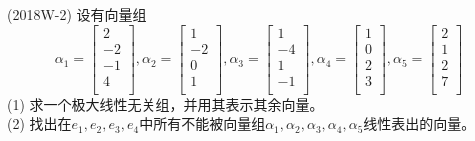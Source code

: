 \documentclass[lang=cn,newtx,10pt,scheme=chinese]{elegantbook}
\begin{document}
\begin{exercise}
    (2018W-2) 设有向量组
    $$
    \alpha_1=
    \left[
    \begin{matrix}
        2 \\
        -2 \\
        -1 \\
        4 \\
    \end{matrix}
    \right],
    \alpha_2=
    \left[
    \begin{matrix}
        1 \\
        -2 \\
        0 \\
        1 \\
    \end{matrix}
    \right],
    \alpha_3=
    \left[
    \begin{matrix}
        1 \\
        -4 \\
        1 \\
        -1 \\
    \end{matrix}
    \right],
    \alpha_4=
    \left[
    \begin{matrix}
        1 \\
        0 \\
        2 \\
        3 \\
    \end{matrix}
    \right],
    \alpha_5=
    \left[
    \begin{matrix}
        2 \\
        1 \\
        2 \\
        7 \\
    \end{matrix}
    \right]
    $$
    (1) 求一个极大线性无关组，并用其表示其余向量。\\
    (2) 找出在$e_1,e_2,e_3,e_4$中所有不能被向量组$\alpha_1,\alpha_2,\alpha_3,\alpha_4,\alpha_5$线性表出的向量。
\end{exercise}
\end{document}
